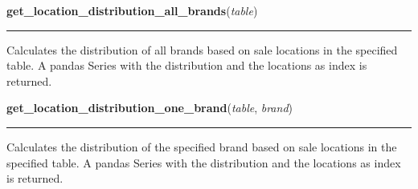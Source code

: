     \label{BilbasenDataMining:datamining:get_location_distribution_all_brands}

    \vspace{0.5ex}

\hspace{.8\funcindent}\begin{boxedminipage}{\funcwidth}

    \raggedright \textbf{get\_location\_distribution\_all\_brands}(\textit{table})

    \vspace{-1.5ex}

    \rule{\textwidth}{0.5\fboxrule}
\setlength{\parskip}{2ex}
    Calculates the distribution of all brands based on sale locations in 
    the specified table. A pandas Series with the distribution and the 
    locations as index is returned.

\setlength{\parskip}{1ex}
    \end{boxedminipage}

    \label{BilbasenDataMining:datamining:get_location_distribution_one_brand}

    \vspace{0.5ex}

\hspace{.8\funcindent}\begin{boxedminipage}{\funcwidth}

    \raggedright \textbf{get\_location\_distribution\_one\_brand}(\textit{table}, \textit{brand})

    \vspace{-1.5ex}

    \rule{\textwidth}{0.5\fboxrule}
\setlength{\parskip}{2ex}
    Calculates the distribution of the specified brand based on sale 
    locations in the specified table. A pandas Series with the distribution
    and the locations as index is returned.

\setlength{\parskip}{1ex}
    \end{boxedminipage}

    \label{BilbasenDataMining:datamining:extract_brands}

